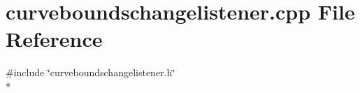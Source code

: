 \section{curveboundschangelistener.\+cpp File Reference}
\label{curveboundschangelistener_8cpp}
{\ttfamily \#include \char`\"{}curveboundschangelistener.\+h\char`\"{}}\\*
